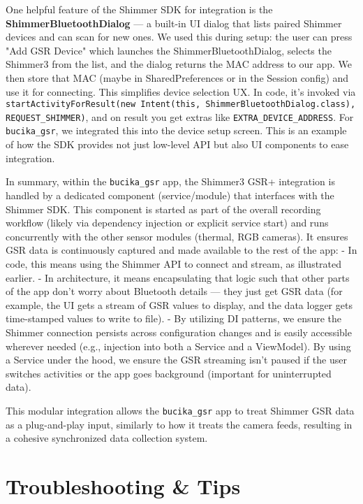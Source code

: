 {{One helpful feature of the Shimmer SDK for integration is the
\textbf{ShimmerBluetoothDialog} --- a built-in UI dialog that lists paired
Shimmer devices and can scan for new
ones\cite{DeviceServer}.
We used this during setup: the user can press "Add GSR Device" which
launches the ShimmerBluetoothDialog, selects the Shimmer3 from the list,
and the dialog returns the MAC address to our
app\cite{DeviceServer}.
We then store that MAC (maybe in SharedPreferences or in the Session
config) and use it for connecting. This simplifies device selection UX.
In code, it's invoked via
\texttt{startActivityForResult(new Intent(this, ShimmerBluetoothDialog.class), REQUEST_SHIMMER)},
and on result you get extras like \texttt{EXTRA_DEVICE_ADDRESS}. For
\texttt{bucika_gsr}, we integrated this into the device setup screen. This is
an example of how the SDK provides not just low-level API but also UI
components to ease integration.

In summary, within the \texttt{bucika_gsr} app, the Shimmer3 GSR+ integration
is handled by a dedicated component (service/module) that interfaces
with the Shimmer SDK. This component is started as part of the overall
recording workflow (likely via dependency injection or explicit service
start) and runs concurrently with the other sensor modules (thermal, RGB
cameras). It ensures GSR data is continuously captured and made
available to the rest of the app: - In code, this means using the
Shimmer API to connect and stream, as illustrated earlier. - In
architecture, it means encapsulating that logic such that other parts of
the app don't worry about Bluetooth details --- they just get GSR data
(for example, the UI gets a stream of GSR values to display, and the
data logger gets time-stamped values to write to file). - By utilizing
DI patterns, we ensure the Shimmer connection persists across
configuration changes and is easily accessible wherever needed (e.g.,
injection into both a Service and a ViewModel). By using a Service under
the hood, we ensure the GSR streaming isn't paused if the user switches
activities or the app goes background (important for uninterrupted
data).

This modular integration allows the \texttt{bucika_gsr} app to treat Shimmer
GSR data as a plug-and-play input, similarly to how it treats the camera
feeds, resulting in a cohesive synchronized data collection system.

\section{Troubleshooting & Tips}

}}

